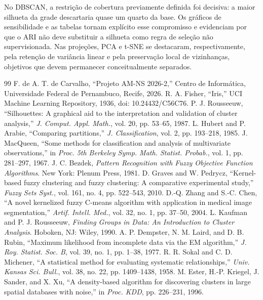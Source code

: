 \documentclass[conference,a4paper]{IEEEtran}
\begin{document}
No DBSCAN, a restrição de cobertura previamente definida foi decisiva: a maior silhueta da grade descartaria quase um quarto da base. Os gráficos de sensibilidade e as tabelas tornam explícito esse compromisso e evidenciam por que o ARI não deve substituir a silhueta como regra de seleção não supervisionada. Nas projeções, PCA e t-SNE se destacaram, respectivamente, pela retenção de variância linear e pela preservação local de vizinhanças, objetivos que devem permanecer conceitualmente separados.

\balance
\begin{thebibliography}{99}
 F. de A. T. de Carvalho, ``Projeto AM-NS 2026-2,'' Centro de Informática, Universidade Federal de Pernambuco, Recife, 2026.
 R. A. Fisher, ``Iris,'' UCI Machine Learning Repository, 1936, doi: 10.24432/C56C76.
 P. J. Rousseeuw, ``Silhouettes: A graphical aid to the interpretation and validation of cluster analysis,'' \emph{J. Comput. Appl. Math.}, vol. 20, pp. 53--65, 1987.
 L. Hubert and P. Arabie, ``Comparing partitions,'' \emph{J. Classification}, vol. 2, pp. 193--218, 1985.
 J. MacQueen, ``Some methods for classification and analysis of multivariate observations,'' in \emph{Proc. 5th Berkeley Symp. Math. Statist. Probab.}, vol. 1, pp. 281--297, 1967.
 J. C. Bezdek, \emph{Pattern Recognition with Fuzzy Objective Function Algorithms}. New York: Plenum Press, 1981.
 D. Graves and W. Pedrycz, ``Kernel-based fuzzy clustering and fuzzy clustering: A comparative experimental study,'' \emph{Fuzzy Sets Syst.}, vol. 161, no. 4, pp. 522--543, 2010.
 D.-Q. Zhang and S.-C. Chen, ``A novel kernelized fuzzy C-means algorithm with application in medical image segmentation,'' \emph{Artif. Intell. Med.}, vol. 32, no. 1, pp. 37--50, 2004.
 L. Kaufman and P. J. Rousseeuw, \emph{Finding Groups in Data: An Introduction to Cluster Analysis}. Hoboken, NJ: Wiley, 1990.
 A. P. Dempster, N. M. Laird, and D. B. Rubin, ``Maximum likelihood from incomplete data via the EM algorithm,'' \emph{J. Roy. Statist. Soc. B}, vol. 39, no. 1, pp. 1--38, 1977.
 R. R. Sokal and C. D. Michener, ``A statistical method for evaluating systematic relationships,'' \emph{Univ. Kansas Sci. Bull.}, vol. 38, no. 22, pp. 1409--1438, 1958.
 M. Ester, H.-P. Kriegel, J. Sander, and X. Xu, ``A density-based algorithm for discovering clusters in large spatial databases with noise,'' in \emph{Proc. KDD}, pp. 226--231, 1996.

\end{thebibliography}
\end{document}
